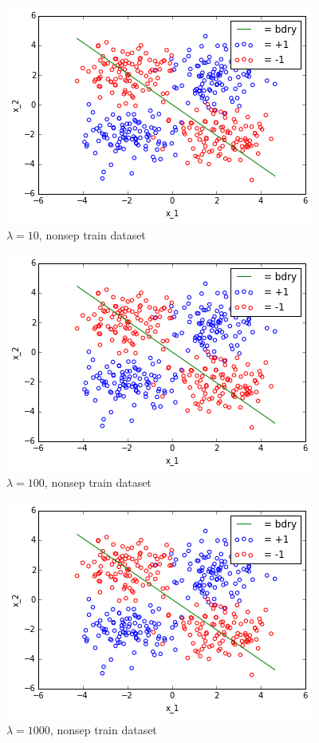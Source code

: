 \documentclass[10pt]{article}
\begin{document}
\begin{figure}
 \centering
 \includegraphics[scale=0.5]{nonsep_train_lam_10.png}
 \caption{$\lambda = 10$, nonsep train dataset}
  \label{nonsep_train_lam_10}
 \end{figure}
 \begin{figure}
 \centering
 \includegraphics[scale=0.5]{nonsep_train_lam_100.png}
 \caption{$\lambda = 100$, nonsep train dataset}
 \label{nonsep_train_lam_100}
 \end{figure}
 \begin{figure}
 \centering
 \includegraphics[scale=0.5]{nonsep_train_lam_1000.png}
 \caption{$\lambda = 1000$, nonsep train dataset}
 \label{nonsep_train_lam_1000}
 \end{figure}
\end{document}
